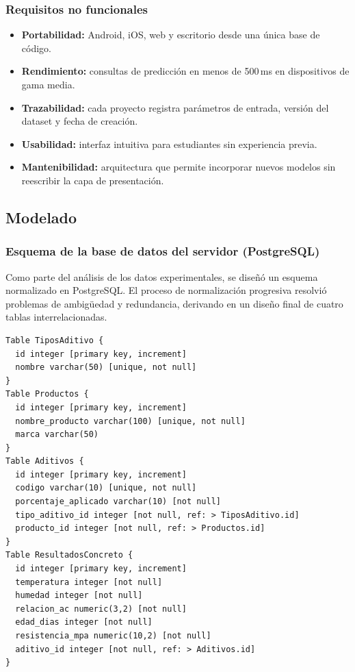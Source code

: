 \documentclass[12pt, letterpaper]{article}
\begin{document}
\subsubsection*{Requisitos no funcionales}
\begin{itemize}
    \item \textbf{Portabilidad:} Android, iOS, web y escritorio desde una única base de código.
    \item \textbf{Rendimiento:} consultas de predicción en menos de 500\,ms en dispositivos de gama media.
    \item \textbf{Trazabilidad:} cada proyecto registra parámetros de entrada, versión del dataset y fecha de creación.
    \item \textbf{Usabilidad:} interfaz intuitiva para estudiantes sin experiencia previa.
    \item \textbf{Mantenibilidad:} arquitectura que permite incorporar nuevos modelos sin reescribir la capa de presentación.
\end{itemize}

\subsection{Modelado}

\subsubsection*{Esquema de la base de datos del servidor (PostgreSQL)}

Como parte del análisis de los datos experimentales, se diseñó un esquema normalizado en PostgreSQL. El proceso de normalización progresiva resolvió problemas de ambigüedad y redundancia, derivando en un diseño final de cuatro tablas interrelacionadas.

\begin{lstlisting}[style=dbmlstyle, caption=Esquema de la base de datos en DBML (PostgreSQL).]
Table TiposAditivo {
  id integer [primary key, increment]
  nombre varchar(50) [unique, not null]
}
Table Productos {
  id integer [primary key, increment]
  nombre_producto varchar(100) [unique, not null]
  marca varchar(50)
}
Table Aditivos {
  id integer [primary key, increment]
  codigo varchar(10) [unique, not null]
  porcentaje_aplicado varchar(10) [not null]
  tipo_aditivo_id integer [not null, ref: > TiposAditivo.id]
  producto_id integer [not null, ref: > Productos.id]
}
Table ResultadosConcreto {
  id integer [primary key, increment]
  temperatura integer [not null]
  humedad integer [not null]
  relacion_ac numeric(3,2) [not null]
  edad_dias integer [not null]
  resistencia_mpa numeric(10,2) [not null]
  aditivo_id integer [not null, ref: > Aditivos.id]
}
\end{lstlisting}
\end{document}

